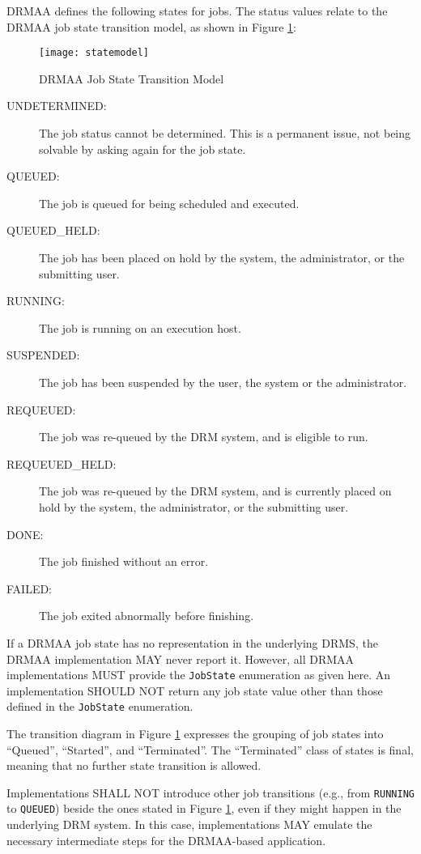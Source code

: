 \documentclass{article}
\newcommand{\h}[1]{\lstinline|#1|}
\begin{document}
DRMAA defines the following states for jobs. The status values relate to the DRMAA job state transition model, as shown in Figure \ref{fig:statemodel}:

\begin{figure}[ht]
\centering
\texttt{[image: statemodel]}
\caption{DRMAA Job State Transition Model}
\label{fig:statemodel}
\end{figure}



\begin{description}
\item[UNDETERMINED:] The job status cannot be determined. This is a permanent issue, not being solvable by asking again for the job state.
\item[QUEUED:] The job is queued for being scheduled and executed.
\item[QUEUED\_HELD:] The job has been placed on hold by the system, the administrator, or the submitting user.
\item[RUNNING:] The job is running on an execution host.
\item[SUSPENDED:] The job has been suspended by the user, the system or the administrator.
\item[REQUEUED:] The job was re-queued by the DRM system, and is eligible to run.
\item[REQUEUED\_HELD:] The job was re-queued by the DRM system, and is currently placed on hold by the system, the administrator, or the submitting user.
\item[DONE:] The job finished without an error.
\item[FAILED:] The job exited abnormally before finishing.
\end{description}

If a DRMAA job state has no representation in the underlying DRMS, the DRMAA implementation MAY never report it. However, all DRMAA implementations MUST provide the \h{JobState} enumeration as given here. An implementation SHOULD NOT return any job state value other than those defined in the \h{JobState} enumeration.

The transition diagram in Figure \ref{fig:statemodel} expresses the grouping of job states into \enquote{Queued}, \enquote{Started}, and \enquote{Terminated}. The \enquote{Terminated} class of states is final, meaning that no further state transition is  allowed. 

Implementations SHALL NOT introduce other job transitions (e.g., from \h{RUNNING} to \h{QUEUED}) beside the ones stated in Figure \ref{fig:statemodel}, even if they might happen in the underlying DRM system. In this case, implementations MAY emulate the necessary intermediate steps for the DRMAA-based application. 
\end{document}
